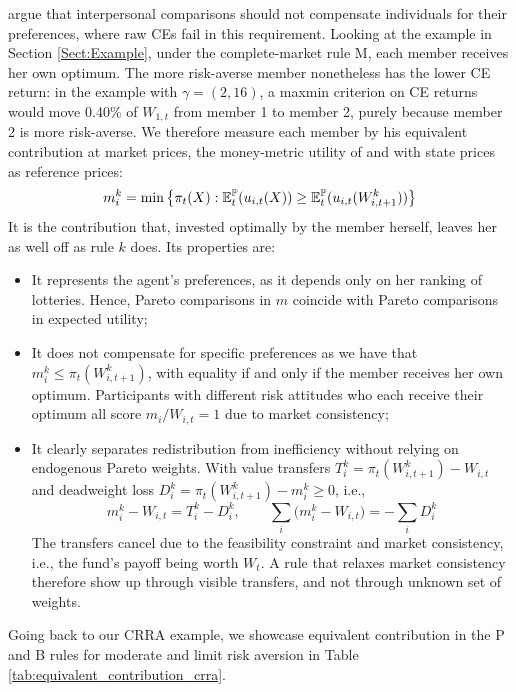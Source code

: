 \citet{FleurbaeyManiquet2011} argue that interpersonal comparisons should not compensate individuals for their preferences, where raw CEs fail in this requirement. Looking at the example in Section \ref{Sect:Example}, under the complete-market rule M, each member receives her own optimum. The more risk-averse member nonetheless has the lower CE return: in the example with $\gamma=(2,16)$, a maxmin criterion on CE returns would move 0.40\% of $W_{1,t}$ from member 1 to member 2, purely because member 2 is more risk-averse. We therefore measure each member by his equivalent contribution at market prices, the money-metric utility of \citet{McKenzie1957} and \citet{Samuelson1974} with state prices as reference prices:
\begin{equation}
    m_i^k = \min\left\{ \pi_t(X): \mathbb{E}_t^{\mathbb{P}}(u_{i,t}(X)) \geq \mathbb{E}_t^{\mathbb{P}}(u_{i,t}(W_{i,t+1}^k)) \right\}
\end{equation}
It is the contribution that, invested optimally by the member herself, leaves her as well off as rule $k$ does. Its properties are:
\begin{itemize}
    \item It represents the agent's preferences, as it depends only on her ranking of lotteries. Hence, Pareto comparisons in $m$ coincide with Pareto comparisons in expected utility;
    \item It does not compensate for specific preferences as we have that $m_i^k \leq \pi_t(W_{i,t+1}^k)$, with equality if and only if the member receives her own optimum. Participants with different risk attitudes who each receive their optimum all score $m_i/W_{i,t} = 1$ due to market consistency;
    \item It clearly separates redistribution from inefficiency without relying on endogenous Pareto weights. With value transfers $T_i^k = \pi_t(W_{i,t+1}^k) - W_{i,t}$ and deadweight loss $D_i^k = \pi_t(W_{i,t+1}^k) - m_i^k \geq 0$, i.e.,
    \begin{equation*}
        m^k_i-W_{i,t}=T^k_i-D^k_i,\qquad \sum_i\big(m^k_i-W_{i,t}\big)=-\sum_i D^k_i
    \end{equation*}
    The transfers cancel due to the feasibility constraint and market consistency, i.e., the fund's payoff being worth $W_t$. A rule that relaxes market consistency therefore show up through visible transfers, and not through unknown set of weights.
\end{itemize}
Going back to our CRRA example, we showcase equivalent contribution in the P and B rules for moderate and limit risk aversion in Table \ref{tab:equivalent_contribution_crra}.
